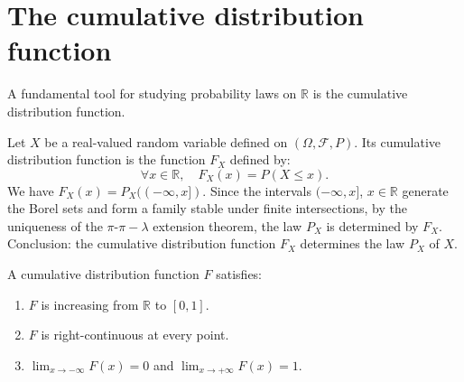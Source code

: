\section{The cumulative distribution function}%
A fundamental tool for studying probability laws on $\mathbb{R}$ is the cumulative distribution function.%
\begin{definition}
Let $X$ be a real-valued random variable defined on $(\Omega, \mathcal{F}, P)$. Its cumulative distribution function is the function $F_X$ defined by:
\[
\forall x \in \mathbb{R}, \quad F_X(x) = P(X \le x).
\]
We have $F_X(x) = P_X((-\infty, x])$. Since the intervals $(-\infty, x]$, $x \in \mathbb{R}$ generate the Borel sets and form a family stable under finite intersections, by the uniqueness of the $\pi$-$\pi-\lambda$ extension theorem, the law $P_X$ is determined by $F_X$.
Conclusion: the cumulative distribution function $F_X$ determines the law $P_X$ of $X$.
\end{definition}%
A cumulative distribution function $F$ satisfies:%
\begin{enumerate}
    \item[i)] $F$ is increasing from $\mathbb{R}$ to $[0, 1]$.
    \item[ii)] $F$ is right-continuous at every point.
    \item[iii)] $\lim_{x \to -\infty} F(x) = 0$ and $\lim_{x \to +\infty} F(x) = 1$.
\end{enumerate}%
